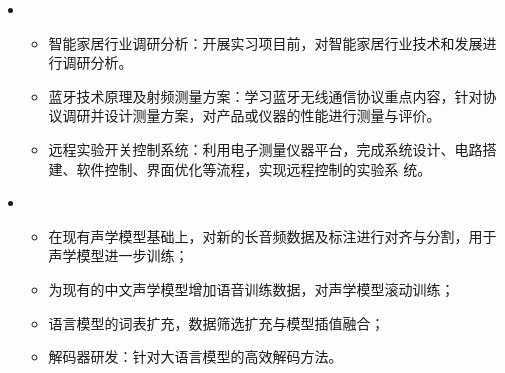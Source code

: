   \begin{itemize}[leftmargin=*]
    \item
      {\small
      \begin{itemize}
        \item 智能家居行业调研分析：开展实习项目前，对智能家居行业技术和发展进行调研分析。
        \item 蓝牙技术原理及射频测量方案：学习蓝牙无线通信协议重点内容，针对协议调研并设计测量方案，对产品或仪器的性能进行测量与评价。
        \item 远程实验开关控制系统：利用电子测量仪器平台，完成系统设计、电路搭建、软件控制、界面优化等流程，实现远程控制的实验系
        统。
      \end{itemize}
      }
  \end{itemize}
  \begin{itemize}[leftmargin=*]
  \item
    {\small
    \begin{itemize}
      \item 在现有声学模型基础上，对新的长音频数据及标注进行对齐与分割，用于声学模型进一步训练；
      \item 为现有的中文声学模型增加语音训练数据，对声学模型滚动训练；
      \item 语言模型的词表扩充，数据筛选扩充与模型插值融合；
      \item 解码器研发：针对大语言模型的高效解码方法。
    \end{itemize}
    }
  \end{itemize}